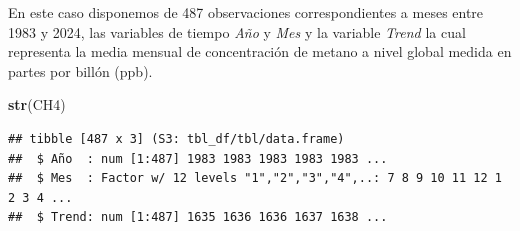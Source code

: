 \documentclass[12pt,a4paper,]{book}
\newenvironment{Shaded}{\begin{snugshade}}{\end{snugshade}}
\newcommand{\AttributeTok}[1]{\textcolor[rgb]{0.13,0.29,0.53}{#1}}
\newcommand{\CommentTok}[1]{\textcolor[rgb]{0.56,0.35,0.01}{\textit{#1}}}
\newcommand{\DecValTok}[1]{\textcolor[rgb]{0.00,0.00,0.81}{#1}}
\newcommand{\FunctionTok}[1]{\textcolor[rgb]{0.13,0.29,0.53}{\textbf{#1}}}
\newcommand{\NormalTok}[1]{#1}
\newcommand{\OtherTok}[1]{\textcolor[rgb]{0.56,0.35,0.01}{#1}}
\newcommand{\SpecialCharTok}[1]{\textcolor[rgb]{0.81,0.36,0.00}{\textbf{#1}}}
\newcommand{\StringTok}[1]{\textcolor[rgb]{0.31,0.60,0.02}{#1}}
\numberwithin{dummy}{section}
\theoremstyle{ocrenumbox}
\theoremstyle{blacknumex}
\theoremstyle{blacknumbox}
\theoremstyle{ocrenum}
\theoremstyle{ocrenum}
\begin{document}
\begin{Shaded}
\end{Shaded}

En este caso disponemos de 487 observaciones correspondientes a meses
entre 1983 y 2024, las variables de tiempo \emph{Año} y \emph{Mes} y la
variable \emph{Trend} la cual representa la media mensual de
concentración de metano a nivel global medida en partes por billón
(ppb).

\begin{Shaded}
\begin{Highlighting}[]
\FunctionTok{str}\NormalTok{(CH4)}
\end{Highlighting}
\end{Shaded}

\begin{verbatim}
## tibble [487 x 3] (S3: tbl_df/tbl/data.frame)
##  $ Año  : num [1:487] 1983 1983 1983 1983 1983 ...
##  $ Mes  : Factor w/ 12 levels "1","2","3","4",..: 7 8 9 10 11 12 1 2 3 4 ...
##  $ Trend: num [1:487] 1635 1636 1636 1637 1638 ...
\end{verbatim}
\end{document}
